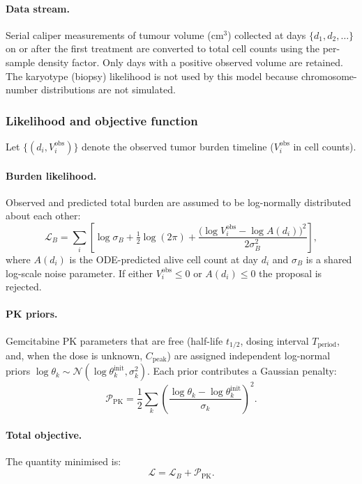 \documentclass[11pt,notitlepage]{article}
\begin{document}
\paragraph{Data stream.}
Serial caliper measurements of tumour volume (cm$^3$) collected at days
$\{d_1,d_2,\ldots\}$ on or after the first treatment are converted to
total cell counts using the per-sample density factor.
Only days with a positive observed volume are retained.
The karyotype (biopsy) likelihood is not used by this model because
chromosome-number distributions are not simulated.


\subsubsection{Likelihood and objective function}
\label{sec:invivo_likelihood}

Let $\{(d_i,V_i^{\mathrm{obs}})\}$ denote the observed tumor burden
timeline ($V_i^{\mathrm{obs}}$ in cell counts).

\paragraph{Burden likelihood.}
Observed and predicted total burden are assumed to be log-normally
distributed about each other:
\[
\mathcal{L}_B
=
\sum_{i}
\left[
  \log\sigma_B
  +\tfrac{1}{2}\log(2\pi)
  +\frac{\bigl(\log V_i^{\mathrm{obs}}-\log A(d_i)\bigr)^2}{2\sigma_B^2}
\right],
\]
where $A(d_i)$ is the ODE-predicted alive cell count at day $d_i$ and
$\sigma_B$ is a shared log-scale noise parameter.
If either $V_i^{\mathrm{obs}}\le 0$ or $A(d_i)\le 0$ the proposal is
rejected.

\paragraph{PK priors.}
Gemcitabine PK parameters that are free (half-life $t_{1/2}$, dosing
interval $T_{\mathrm{period}}$, and, when the dose is unknown, $C_{\mathrm{peak}}$)
are assigned independent log-normal priors
$\log\theta_k\sim\mathcal{N}(\log\theta_k^{\mathrm{init}},\sigma_k^2)$.
Each prior contributes a Gaussian penalty:
\[
\mathcal{P}_{\mathrm{PK}}
=
\frac{1}{2}\sum_k
\left(
\frac{\log\theta_k-\log\theta_k^{\mathrm{init}}}{\sigma_k}
\right)^{\!2}.
\]

\paragraph{Total objective.}
The quantity minimised is:
\[
\mathcal{L}=\mathcal{L}_B+\mathcal{P}_{\mathrm{PK}}.
\]
\end{document}
